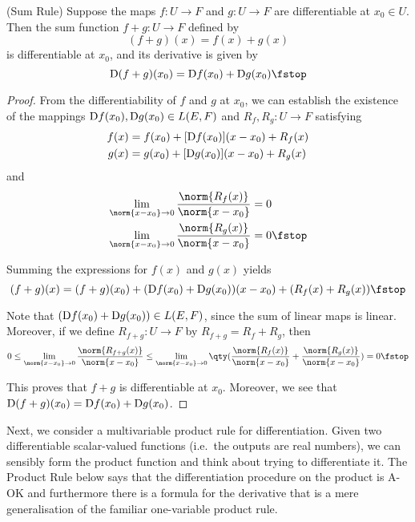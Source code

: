 \begin{theorem}
  (Sum Rule) Suppose the maps \( f:U\to F \) and \( g:U\to F \) are differentiable at \( x_0\in U \). Then the sum function \( f+g:U\to F \) defined by
  \[ (f+g)(x)=f(x)+g(x) \]
  is differentiable at \( x_0 \), and its derivative is given by
  \[ \D (f+g)(x_0)=\D f(x_0)+\D g(x_0)\fstop \]
\end{theorem}
\begin{proof}
  From the differentiability of \( f \) and \( g \) at \( x_0 \), we can establish the existence of the mappings \( \text{D} f(x_0),\text{D} g(x_0)\in L(E,F) \) and \( R_f,R_g:U\to F \) satisfying
  \begin{align*}
    f(x)&= f(x_0)+[\text{D} f(x_0)](x-x_0)+R_f(x)\\
    g(x)&= g(x_0)+[\text{D} g(x_0)](x-x_0)+R_g(x)
  \end{align*}
  and
  \begin{align*}
    \lim_{\norm{x-x_0}\to 0}\frac{\norm{R_f(x)}}{\norm{x-x_0}}&= 0\\
    \lim_{\norm{x-x_0}\to 0}\frac{\norm{R_g(x)}}{\norm{x-x_0}}&= 0\fstop
  \end{align*}

  Summing the expressions for \( f(x) \) and \( g(x) \) yields
  \[ (f+g)(x)=(f+g)(x_0)+(\D f(x_0)+\D g(x_0))(x-x_0)+(R_f(x)+R_g(x))\fstop \]

  Note that \( (\text{D} f(x_0)+\text{D} g(x_0))\in L(E,F) \), since the sum of linear maps is linear. Moreover, if we define \( R_{f+g}:U\to F \) by \( R_{f+g}=R_f+R_g \), then
  \[ 0\leq\lim_{\norm{x-x_0}\to 0}\frac{\norm{R_{f+g}(x)}}{\norm{x-x_0}}\leq\lim_{\norm{x-x_0}\to 0}\qty(\frac{\norm{R_f(x)}}{\norm{x-x_0}}+\frac{\norm{R_g(x)}}{\norm{x-x_0}})=0\fstop \]

  This proves that \( f+g \) is differentiable at \( x_0 \). Moreover, we see that \( \text{D}(f+g)(x_0)=\text{D} f(x_0)+\text{D} g(x_0) \).
\end{proof}

Next, we consider a multivariable product rule for differentiation. Given two differentiable scalar-valued functions (i.e.\ the outputs are real numbers), we can sensibly form the product function and think about trying to differentiate it. The Product Rule below says that the differentiation procedure on the product is A-OK and furthermore there is a formula for the derivative that is a mere generalisation of the familiar one-variable product rule.

